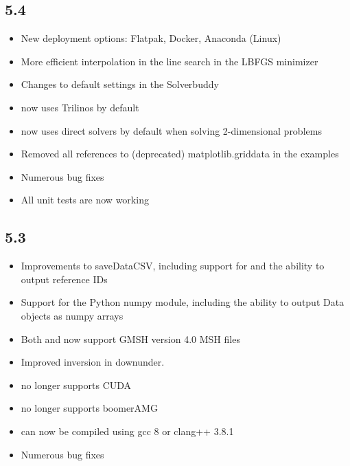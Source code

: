 \subsection*{5.4}
\begin{itemize}
\item New deployment options: Flatpak, Docker, Anaconda (Linux)
\item More efficient interpolation in the line search in the LBFGS minimizer
\item Changes to default settings in the Solverbuddy
\item \escript now uses Trilinos by default 
\item \escript now uses direct solvers by default when solving 2-dimensional problems
\item Removed all references to (deprecated) matplotlib.griddata in the examples
\item Numerous bug fixes
\item All unit tests are now working
\end{itemize}

\subsection*{5.3}
\begin{itemize}
\item Improvements to saveDataCSV, including support for \speckley and the ability to output reference IDs
\item Support for the Python numpy module, including the ability to output Data objects as numpy arrays
\item Both \finley and \dudley now support GMSH version 4.0 MSH files
\item Improved inversion in downunder.
\item \escript no longer supports CUDA
\item \escript no longer supports boomerAMG
\item \escript can now be compiled using gcc 8 or clang++ 3.8.1
\item Numerous bug fixes
\end{itemize}

